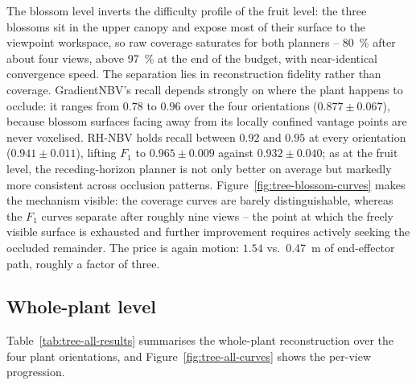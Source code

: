 The blossom level inverts the difficulty profile of the fruit level: the
three blossoms sit in the upper canopy and expose most of their surface to
the viewpoint workspace, so raw coverage saturates for both planners --
\SI{80}{\percent} after about four views, above \SI{97}{\percent} at the end
of the budget, with near-identical convergence speed. The separation lies in
reconstruction fidelity rather than coverage. GradientNBV's recall depends
strongly on where the plant happens to occlude: it ranges from $0.78$ to
$0.96$ over the four orientations ($0.877 \pm 0.067$), because blossom
surfaces facing away from its locally confined vantage points are never
voxelised. RH-NBV holds recall between $0.92$ and $0.95$ at every
orientation ($0.941 \pm 0.011$), lifting $F_1$ to $0.965 \pm 0.009$ against
$0.932 \pm 0.040$; as at the fruit level, the receding-horizon planner is
not only better on average but markedly more consistent across occlusion
patterns. Figure~\ref{fig:tree-blossom-curves} makes the mechanism visible:
the coverage curves are barely distinguishable, whereas the $F_1$ curves
separate after roughly nine views -- the point at which the freely visible
surface is exhausted and further improvement requires actively seeking the
occluded remainder. The price is again motion: $1.54$ vs.\
\SI{0.47}{\metre} of end-effector path, roughly a factor of three.

\subsection{Whole-plant level}
\label{sec:tree-results-all}

Table~\ref{tab:tree-all-results} summarises the whole-plant reconstruction
over the four plant orientations, and
Figure~\ref{fig:tree-all-curves} shows the per-view progression.

